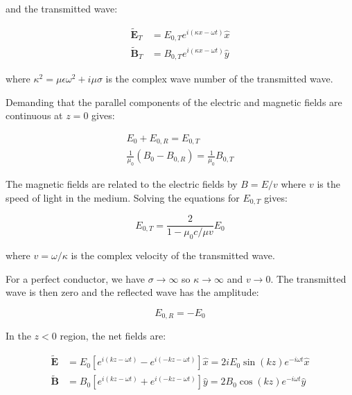 \documentclass[12pt]{article}
\begin{document}
and the transmitted wave:

\begin{equation}
\begin{split}
    \tilde{\mathbf{E}}_{T} &= E_{0,T} e^{i(\kappa x - \omega t)} \hat{x} \\
    \tilde{\mathbf{B}}_{T} &= B_{0,T} e^{i(\kappa x - \omega t)} \hat{y}
\end{split}
\end{equation}

where $\kappa^{2} = \mu \epsilon \omega^{2} + i\mu \sigma$ is the complex wave number of the transmitted wave.

Demanding that the parallel components of the electric and magnetic fields are continuous at $z = 0$ gives:

\begin{equation}
\begin{split}
    E_{0} + E_{0, R} = E_{0, T} \\
    \frac{1}{\mu_{0}} (B_{0} - B_{0, R}) = \frac{1}{\mu_{0}} B_{0, T}
\end{split}
\end{equation}

The magnetic fields are related to the electric fields by $B = E/v$ where $v$ is the speed of light in the medium. Solving the equations for $E_{0, T}$ gives:

\begin{equation}
    E_{0, T} = \frac{2}{1 - \mu_{0}c/\mu v} E_{0}
\end{equation}

where $v = \omega/\kappa$ is the complex velocity of the transmitted wave.

For a perfect conductor, we have $\sigma \to \infty$ so $\kappa \to \infty$ and $v \to 0$. The transmitted wave is then zero and the reflected wave has the amplitude:

\begin{equation}
    E_{0, R} = -E_{0}
\end{equation}

In the $z<0$ region, the net fields are:

\begin{equation}
\begin{split}
    \tilde{\mathbf{E}} &= E_{0} \left[ e^{i(kz - \omega t)} - e^{i(-kz - \omega t)} \right] \hat{x} = 2i E_{0} \sin{(kz)} e^{-i\omega t} \hat{x} \\
    \tilde{\mathbf{B}} &= B_{0} \left[ e^{i(kz - \omega t)} + e^{i(-kz - \omega t)} \right] \hat{y} = 2 B_{0} \cos{(kz)} e^{-i\omega t} \hat{y}
\end{split}
\end{equation}
\end{document}
